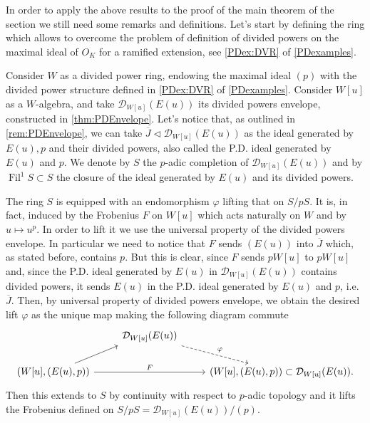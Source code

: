 \noindent
In order to apply the above results to the proof of the main theorem of the section
we still need some remarks and definitions.
Let's start by defining the ring which allows to overcome the problem of
definition of divided powers on the maximal ideal of $O_K$
for a ramified extension, see \cref{PDex:DVR} of \cref{PDexamples}.


\begin{defn}[]
	Consider $W$ as a divided power ring, endowing the maximal ideal $(p)$
	with the divided power structure defined in \cref{PDex:DVR} of \cref{PDexamples}.
	Consider $W[u]$ as a $W$-algebra, and take $\mathcal{D}_{W[u]}(E(u))$
	its divided powers envelope, constructed in \cref{thm:PDEnvelope}.
	Let's notice that, as outlined in \cref{rem:PDEnvelope},
	we can take $\overline{J} \triangleleft \mathcal{D}_{W[u]}(E(u))$ 
	as the ideal generated by $E(u), p$ and their divided powers,
	also called the P.D. ideal generated by $E(u)$ and $p$.
	We denote by $S$ the $p$-adic completion of $\mathcal{D}_{W[u]}(E(u))$
	and by $\operatorname{Fil}^1 S \subset S$ the closure of the ideal
	generated by $E(u)$ and its divided powers.
\end{defn}


\begin{rem}[]\label{rem:liftFrobeniusS}
	The ring $S$ is equipped with an endomorphism $\varphi$ lifting that on $S/pS$.
	It is, in fact, induced by the Frobenius \(F\) on $W[u]$ which acts naturally
	on $W$ and by $u \mapsto u^p$.
	In order to lift it we use the universal property of
	the divided powers envelope.
	In particular we need to notice that \(F\) sends $(E(u))$
	into $\overline{J}$ which, as stated before, contains $p$.
	But this is clear, since $F$ sends $pW[u]$ to $pW[u]$ and, 
	since the P.D. ideal generated by $E(u)$ in $\mathcal{D}_{W[u]}(E(u))$
	contains divided powers, it sends $E(u)$ in the P.D. ideal
	generated by $E(u)$ and $p$, i.e$.$ \(\overline{J}\).
	Then, by universal property of divided powers envelope, we obtain the desired 
	lift $\varphi$ as the unique map making the following diagram commute
	\begin{equation*}
	\begin{tikzcd}
		&
		\mathcal{D}_{W[u]}(E(u))
		\arrow[rd, "\varphi", dashrightarrow,
		start anchor=south east] & \\
		\left( W[u], (E(u),p)\right) \arrow[ru, "", rightarrow,
		end anchor=south west] 
		\arrow[rr, "F", rightarrow] & &
		\left( W[u], (E(u),p)\right) \subset
		\mathcal{D}_{W[u]}(E(u)). 
	\end{tikzcd}
	\end{equation*}
	Then this extends to $S$ by continuity with respect to $p$-adic
	topology and it lifts the Frobenius defined on
	$S/pS = \mathcal{D}_{W[u]}(E(u))/ (p)$.
\end{rem}


